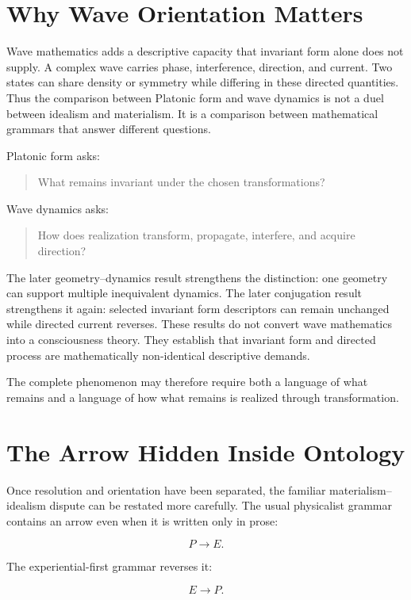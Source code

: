 \section{Why Wave Orientation Matters}

Wave mathematics adds a descriptive capacity that invariant form alone does not supply. A complex wave carries phase, interference, direction, and current. Two states can share density or symmetry while differing in these directed quantities. Thus the comparison between Platonic form and wave dynamics is not a duel between idealism and materialism. It is a comparison between mathematical grammars that answer different questions.

Platonic form asks:

\begin{quote}
What remains invariant under the chosen transformations?
\end{quote}

Wave dynamics asks:

\begin{quote}
How does realization transform, propagate, interfere, and acquire direction?
\end{quote}

The later geometry--dynamics result strengthens the distinction: one geometry can support multiple inequivalent dynamics. The later conjugation result strengthens it again: selected invariant form descriptors can remain unchanged while directed current reverses. These results do not convert wave mathematics into a consciousness theory. They establish that invariant form and directed process are mathematically non-identical descriptive demands.

The complete phenomenon may therefore require both a language of what remains and a language of how what remains is realized through transformation.

\section{The Arrow Hidden Inside Ontology}

Once resolution and orientation have been separated, the familiar materialism--idealism dispute can be restated more carefully. The usual physicalist grammar contains an arrow even when it is written only in prose:

\[
P\longrightarrow E.
\]

The experiential-first grammar reverses it:

\[
E\longrightarrow P.
\]


